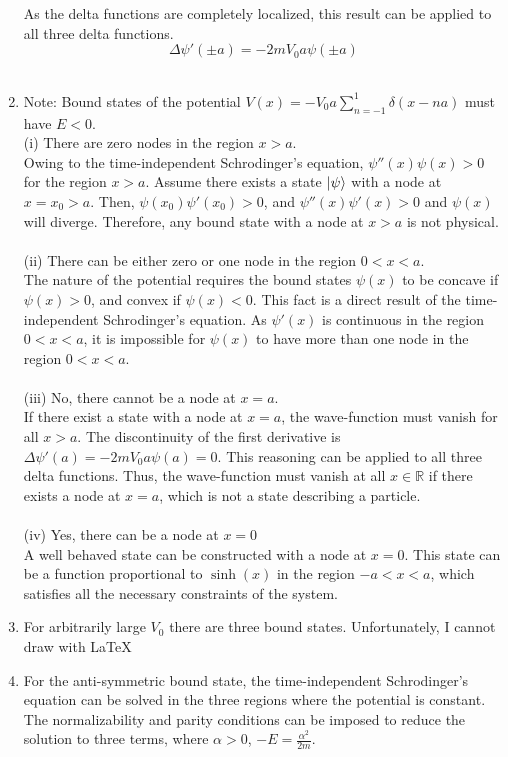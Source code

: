 \begin{sol}
\begin{enumerate}[label=\textbf{(\alph*)}]
	As the delta functions are completely localized, this result can be applied to all three delta functions.
	\begin{equation}
        \Delta\psi'(\pm a)=-2mV_0a\psi(\pm a)
    \end{equation}
	\\
	\item
	Note: Bound states of the potential $V(x)=-V_0a\displaystyle{\sum_{n=-1}^1\delta(x-na)}$ must have $E<0$. \\
	(i) There are zero nodes in the region $x>a$.\\Owing to the time-independent Schrodinger's equation, $\psi''(x)\psi(x)>0$ for the region $x>a$. Assume there exists a state $\ket\psi$ with a node at $x=x_0>a$. Then, $\psi(x_0)\psi'(x_0)>0$, and $\psi''(x)\psi'(x)>0$ and $\psi(x)$ will diverge. Therefore, any bound state with a node at $x>a$ is not physical.\\\\
    (ii) There can be either zero or one node in the region $0 < x < a$.\\
    The nature of the potential requires the bound states $\psi(x)$ to be concave if $\psi(x)>0$, and convex if $\psi(x)<0$. This fact is a direct result of the time-independent Schrodinger's equation. As $\psi'(x)$ is continuous in the region $0 < x < a$, it is impossible for $\psi(x)$ to have more than one node in the region $0 < x < a$.\\\\
    (iii) No, there cannot be a node at $x=a$. \\
    If there exist a state with a node at $x=a$, the wave-function must vanish for all $x>a$. The discontinuity of the first derivative is $\Delta\psi'(a)=-2mV_0a\psi(a)=0$. This reasoning can be applied to all three delta functions. Thus, the wave-function must vanish at all $x\in\mathbb{R}$ if there exists a node at $x=a$, which is not a state describing a particle.\\\\
    (iv) Yes, there can be a node at $x=0$\\
    A well behaved state can be constructed with a node at $x=0$. This state can be a function proportional to $\sinh(x)$ in the region $-a<x<a$, which satisfies all the necessary constraints of the system.
    \item 
	For arbitrarily large $V_0$ there are three bound states. Unfortunately, I cannot draw with \LaTeX    \item
    For the anti-symmetric bound state, the time-independent Schrodinger's equation can be solved in the three regions where the potential is constant. The normalizability and parity conditions can be imposed to reduce the solution to three terms, where $\alpha>0$, $-E=\frac{\alpha^2}{2m}$.

\end{enumerate}
\end{sol}
